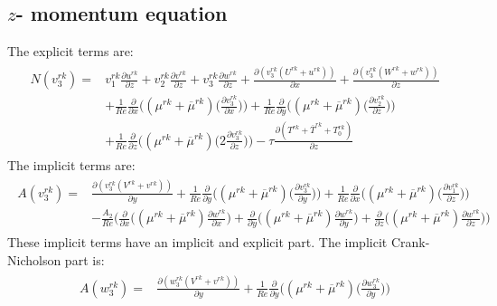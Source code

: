 \documentclass[preprint,12pt]{article}
\begin{document}
\subsection{$z$- momentum equation}
The explicit terms are:
\begin{align}\begin{split}
N(v_3^{rk})=&v_1^{rk}\frac{\partial u^{rk}}{\partial z}+v_2^{rk}\frac{\partial v^{rk}}{\partial z}+v_3^{rk}\frac{\partial w^{rk}}{\partial z}+\frac{\partial (v_3^{rk}(U^{rk}+u^{rk}))}{\partial x}+\frac{\partial (v_3^{rk}(W^{rk}+w^{rk}))}{\partial z}\\&+\frac{1}{Re}\frac{\partial}{\partial x}\Big(({\mu}^{rk}+\overline{\mu}^{rk})\Big(\frac{\partial v_3^{rk}}{\partial x}\Big)\Big)+\frac{1}{Re}\frac{\partial}{\partial y}\Big(({\mu}^{rk}+\overline{\mu}^{rk})\Big(\frac{\partial v_2^{rk}}{\partial z}\Big)\Big)\\&+\frac{1}{Re}\frac{\partial}{\partial z}\Big(({\mu}^{rk}+\overline{\mu}^{rk})\Big(2\frac{\partial v_3^{rk}}{\partial z}\Big)\Big)-\tau\frac{\partial (T^{rk}+\overline{T}^{rk}+T_0^{rk})}{\partial z}
\end{split} \end{align}	
The implicit terms are:
\begin{align}\begin{split}
A(v_3^{rk})=&\frac{\partial (v_3^{rk}(V^{rk}+v^{rk}))}{\partial y}+\frac{1}{Re}\frac{\partial}{\partial y}\Big(({\mu}^{rk}+\overline{\mu}^{rk})\Big(\frac{\partial v_3^{rk}}{\partial y}\Big)\Big)+\frac{1}{Re}\frac{\partial}{\partial x}\Big(({\mu}^{rk}+\overline{\mu}^{rk})\Big(\frac{\partial v_1^{rk}}{\partial z}\Big)\Big)\\&-\frac{A_2}{Re}\Bigg(\frac{\partial}{\partial x}\Big((\mu^{rk}+\overline{\mu}^{rk})\frac{\partial w^{rk}}{\partial x}\Big)+\frac{\partial}{\partial y}\Big((\mu^{rk}+\overline{\mu}^{rk})\frac{\partial w^{rk}}{\partial y}\Big)+\frac{\partial}{\partial z}\Big((\mu^{rk}+\overline{\mu}^{rk})\frac{\partial w^{rk}}{\partial z}\Big)\Bigg)
\end{split} \end{align}	
These implicit terms have an implicit and explicit part. The implicit Crank- Nicholson part is:
\begin{align}\begin{split}
A(w_3^{rk})=&\frac{\partial (w_3^{rk}(V^{rk}+v^{rk}))}{\partial y}+\frac{1}{Re}\frac{\partial}{\partial y}\Big(({\mu}^{rk}+\overline{\mu}^{rk})\Big(\frac{\partial w_3^{rk}}{\partial y}\Big)\Big)
\end{split} \end{align}	
\end{document}
